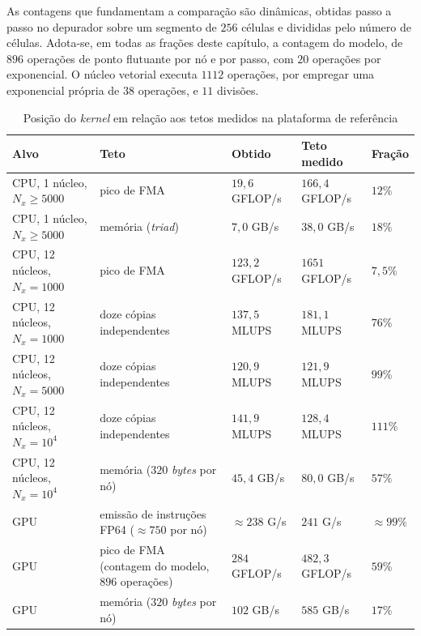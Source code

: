 As contagens que fundamentam a comparação são dinâmicas, obtidas passo a passo no depurador sobre um segmento de \(256\) células e divididas pelo número de células.
Adota-se, em todas as frações deste capítulo, a contagem do modelo, de \(896\) operações de ponto flutuante por nó e por passo, com \(20\) operações por exponencial.
O núcleo vetorial executa \(1112\) operações, por empregar uma exponencial própria de \(38\) operações, e \(11\) divisões.

\begin{table}[H]
    \centering
    \caption{Posição do \textit{kernel} em relação aos tetos medidos na plataforma de referência}
    \label{tab:posicao-roofline}
    \footnotesize
    \begin{tabular}{p{3.0cm}p{3.5cm}>{\centering\arraybackslash}p{2.4cm}>{\centering\arraybackslash}p{2.6cm}>{\centering\arraybackslash}p{1.4cm}}
        \toprule
        Alvo & Teto & Obtido & Teto medido & Fração \\
        \midrule
        CPU, 1 núcleo, $N_x \ge 5000$ & pico de FMA & $19{,}6$ GFLOP/s & $166{,}4$ GFLOP/s & $12\%$ \\
        CPU, 1 núcleo, $N_x \ge 5000$ & memória (\textit{triad}) & $7{,}0$ GB/s & $38{,}0$ GB/s & $18\%$ \\
        CPU, 12 núcleos, $N_x=1000$ & pico de FMA & $123{,}2$ GFLOP/s & $1651$ GFLOP/s & $7{,}5\%$ \\
        CPU, 12 núcleos, $N_x=1000$ & doze cópias independentes & $137{,}5$ MLUPS & $181{,}1$ MLUPS & $76\%$ \\
        CPU, 12 núcleos, $N_x=5000$ & doze cópias independentes & $120{,}9$ MLUPS & $121{,}9$ MLUPS & $99\%$ \\
        CPU, 12 núcleos, $N_x=10^4$ & doze cópias independentes & $141{,}9$ MLUPS & $128{,}4$ MLUPS & $111\%$ \\
        CPU, 12 núcleos, $N_x=10^4$ & memória ($320$ \textit{bytes} por nó) & $45{,}4$ GB/s & $80{,}0$ GB/s & $57\%$ \\
        GPU & emissão de instruções FP64 ($\approx 750$ por nó) & $\approx 238$ G/s & $241$ G/s & $\approx 99\%$ \\
        GPU & pico de FMA (contagem do modelo, $896$ operações) & $284$ GFLOP/s & $482{,}3$ GFLOP/s & $59\%$ \\
        GPU & memória ($320$ \textit{bytes} por nó) & $102$ GB/s & $585$ GB/s & $17\%$ \\
        \bottomrule
    \end{tabular}
\end{table}

